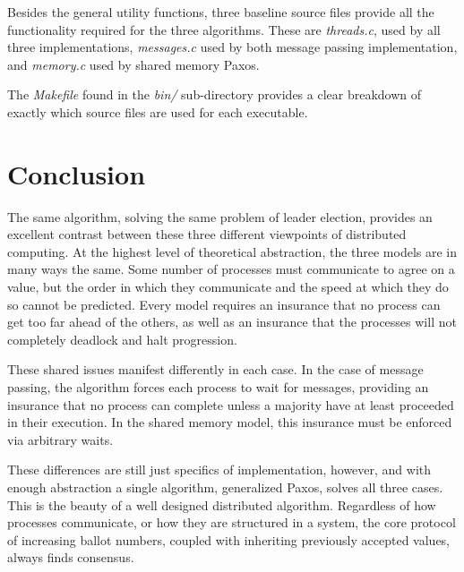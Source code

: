 \documentclass[12pt]{article}
\begin{document}
Besides the general
utility functions, three baseline source files provide all the functionality required for
the three algorithms. These are \textit{threads.c}, used by all three implementations,
\textit{messages.c} used by both message passing implementation, and \textit{memory.c}
used by shared memory Paxos.

The \textit{Makefile} found in the \textit{bin/} sub-directory provides a clear breakdown of exactly
which source files are used for each executable.

\section{Conclusion}
The same algorithm, solving the same problem of leader election,
provides an excellent contrast between these three different
viewpoints of distributed computing. At the highest level
of theoretical abstraction, the three models are in many ways the
same. Some number of processes must communicate to agree on a value,
but the order in which they communicate and the speed at which they
do so cannot be predicted. Every model requires an insurance that
no process can get too far ahead of the others, as well as an insurance
that the processes will not completely deadlock and halt progression.

These shared issues manifest differently in each case. In the case
of message passing, the algorithm forces each process to wait for messages,
providing an insurance that no process can complete unless a majority have at least
proceeded in their execution. In the shared memory model, this insurance must be
enforced via arbitrary waits.

These differences are still just specifics of implementation, however, and
with enough abstraction a single algorithm, generalized Paxos, solves
all three cases. This is the beauty of a well designed distributed algorithm.
Regardless of how processes communicate, or how they are structured in a system,
the core protocol of increasing ballot numbers, coupled with inheriting previously
accepted values, always finds consensus.

\pagebreak
\end{document}
